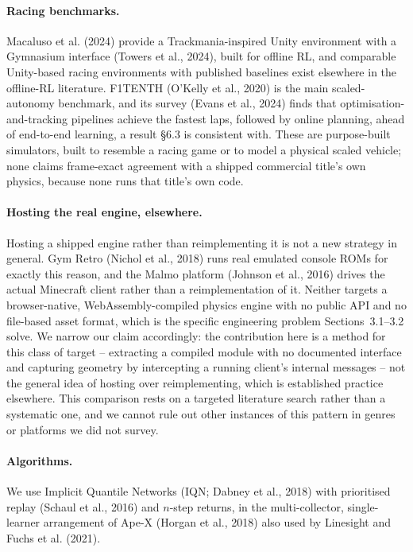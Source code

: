 \documentclass[11pt]{article}
\begin{document}
\paragraph{Racing benchmarks.} Macaluso et al. (2024) provide a Trackmania-inspired Unity environment with a Gymnasium interface (Towers et al., 2024), built for offline RL, and comparable Unity-based racing environments with published baselines exist elsewhere in the offline-RL literature. F1TENTH (O'Kelly et al., 2020) is the main scaled-autonomy benchmark, and its survey (Evans et al., 2024) finds that optimisation-and-tracking pipelines achieve the fastest laps, followed by online planning, ahead of end-to-end learning, a result \S6.3 is consistent with. These are purpose-built simulators, built to resemble a racing game or to model a physical scaled vehicle; none claims frame-exact agreement with a shipped commercial title's own physics, because none runs that title's own code.

\paragraph{Hosting the real engine, elsewhere.} Hosting a shipped engine rather than reimplementing it is not a new strategy in general. Gym Retro (Nichol et al., 2018) runs real emulated console ROMs for exactly this reason, and the Malmo platform (Johnson et al., 2016) drives the actual Minecraft client rather than a reimplementation of it. Neither targets a browser-native, WebAssembly-compiled physics engine with no public API and no file-based asset format, which is the specific engineering problem Sections~3.1--3.2 solve. We narrow our claim accordingly: the contribution here is a method for this class of target -- extracting a compiled module with no documented interface and capturing geometry by intercepting a running client's internal messages -- not the general idea of hosting over reimplementing, which is established practice elsewhere. This comparison rests on a targeted literature search rather than a systematic one, and we cannot rule out other instances of this pattern in genres or platforms we did not survey.

\paragraph{Algorithms.} We use Implicit Quantile Networks (IQN; Dabney et al., 2018) with prioritised replay (Schaul et al., 2016) and $n$-step returns, in the multi-collector, single-learner arrangement of Ape-X (Horgan et al., 2018) also used by Linesight and Fuchs et al. (2021).
\end{document}
